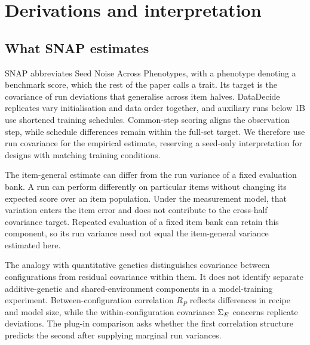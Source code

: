 \section{Derivations and interpretation}
\label{app:derivations}
\subsection{What SNAP estimates}
SNAP abbreviates Seed Noise Across Phenotypes, with a phenotype denoting a benchmark score, which the rest of the paper calls a trait. Its target is the covariance of run deviations that generalise across item halves. DataDecide replicates vary initialisation and data order together, and auxiliary runs below 1B use shortened training schedules. Common-step scoring aligns the observation step, while schedule differences remain within the full-set target. We therefore use run covariance for the empirical estimate, reserving a seed-only interpretation for designs with matching training conditions.

The item-general estimate can differ from the run variance of a fixed evaluation bank. A run can perform differently on particular items without changing its expected score over an item population. Under the measurement model, that variation enters the item error and does not contribute to the cross-half covariance target. Repeated evaluation of a fixed item bank can retain this component, so its run variance need not equal the item-general variance estimated here.

The analogy with quantitative genetics distinguishes covariance between configurations from residual covariance within them. It does not identify separate additive-genetic and shared-environment components in a model-training experiment. Between-configuration correlation $R_P$ reflects differences in recipe and model size, while the within-configuration covariance $\Sigma_E$ concerns replicate deviations. The plug-in comparison asks whether the first correlation structure predicts the second after supplying marginal run variances.

